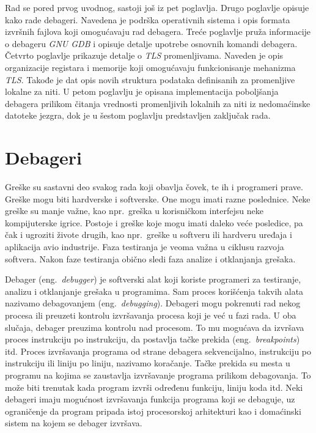 \documentclass[12pt,oneside]{memoir}
\begin{document}
Rad se pored prvog uvodnog, sastoji još iz pet poglavlja. Drugo poglavlje opisuje kako rade debageri. Navedena je podrška operativnih sistema i opis formata izvršnih fajlova koji omogućavaju rad debagera. Treće poglavlje pruža informacije o debageru \emph{GNU GDB} i opisuje detalje upotrebe osnovnih komandi debagera. Četvrto poglavlje prikazuje detalje o \emph{TLS} promenljivama. Naveden je opis organizacije registara i memorije koji omogućavaju funkcionisanje mehanizma \emph{TLS}. Takođe je dat opis novih struktura podataka definisanih za promenljive lokalne za niti. U petom poglavlju je opisana implementacija poboljšanja debagera prilikom čitanja vrednosti promenljivih lokalnih za niti iz nedomaćinske datoteke jezgra, dok je u šestom poglavlju predstavljen zaključak rada.



\chapter{Debageri}
\label{chp:debageri}

Greške su sastavni deo svakog rada koji obavlja čovek, te ih i programeri prave. Greške mogu biti hardverske i softverske. One mogu imati razne poslednice. Neke greške su manje važne, kao npr.~greška u korisničkom interfejsu neke kompijuterske igrice. Postoje i greške koje mogu imati daleko veće posledice, pa čak i ugroziti živote drugih, kao npr.~greške u softveru ili hardveru uređaja i aplikacija avio industrije. Faza testiranja je veoma važna u ciklusu razvoja softvera. Nakon faze testiranja obično sledi faza analize i otklanjanja grešaka.

Debager (eng.~\emph{debugger}) je softverski alat koji koriste programeri za testiranje, analizu i otklanjanje grešaka u programima. Sam proces korišćenja takvih alata nazivamo debagovanjem (eng.~\emph{debugging}).
Debageri mogu pokrenuti rad nekog procesa ili preuzeti kontrolu izvršavanja procesa koji je već u fazi rada. U oba slučaja, debager preuzima kontrolu nad procesom. To mu mogućava da izvršava proces instrukciju po instrukciju, da postavlja tačke prekida (eng.~\emph{breakpoints}) itd. Proces izvršavanja programa od strane debagera sekvencijalno, instrukciju po instrukciju ili liniju po liniju, nazivamo koračanje. Tačke prekida su mesta u programu na kojima se zaustavlja izvršavanje programa prilikom debagovanja. To može biti trenutak kada program izvrši određenu funkciju, liniju koda itd. Neki debageri imaju mogućnost izvršavanja funkcija programa koji se debaguje, uz ograničenje da program pripada istoj procesorskoj arhitekturi kao i domaćinski sistem na kojem se debager izvršava.
\end{document}
